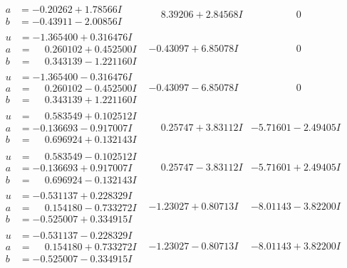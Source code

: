 \documentclass[1p]{elsarticle_modified}
\theoremstyle{definition}
\begin{document}
$$\begin{array}{c|c|c}
\begin{aligned}
a &= -0.20262 + 1.78566 I \\
b &= -0.43911 - 2.00856 I\end{aligned}
 & \phantom{-}8.39206 + 2.84568 I & \phantom{-0.000000 } 0 \\ \hline\begin{aligned}
u &= -1.365400 + 0.316476 I \\
a &= \phantom{-}0.260102 + 0.452500 I \\
b &= \phantom{-}0.343139 - 1.221160 I\end{aligned}
 & -0.43097 + 6.85078 I & \phantom{-0.000000 } 0 \\ \hline\begin{aligned}
u &= -1.365400 - 0.316476 I \\
a &= \phantom{-}0.260102 - 0.452500 I \\
b &= \phantom{-}0.343139 + 1.221160 I\end{aligned}
 & -0.43097 - 6.85078 I & \phantom{-0.000000 } 0 \\ \hline\begin{aligned}
u &= \phantom{-}0.583549 + 0.102512 I \\
a &= -0.136693 - 0.917007 I \\
b &= \phantom{-}0.696924 + 0.132143 I\end{aligned}
 & \phantom{-}0.25747 + 3.83112 I & -5.71601 - 2.49405 I \\ \hline\begin{aligned}
u &= \phantom{-}0.583549 - 0.102512 I \\
a &= -0.136693 + 0.917007 I \\
b &= \phantom{-}0.696924 - 0.132143 I\end{aligned}
 & \phantom{-}0.25747 - 3.83112 I & -5.71601 + 2.49405 I \\ \hline\begin{aligned}
u &= -0.531137 + 0.228329 I \\
a &= \phantom{-}0.154180 - 0.733272 I \\
b &= -0.525007 + 0.334915 I\end{aligned}
 & -1.23027 + 0.80713 I & -8.01143 - 3.82200 I \\ \hline\begin{aligned}
u &= -0.531137 - 0.228329 I \\
a &= \phantom{-}0.154180 + 0.733272 I \\
b &= -0.525007 - 0.334915 I\end{aligned}
 & -1.23027 - 0.80713 I & -8.01143 + 3.82200 I\\

\end{array}$$
\end{document}
